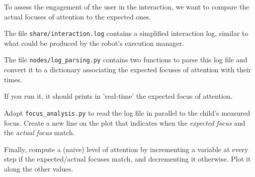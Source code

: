 \documentclass{instructions}
\begin{document}


To assess the engagement of the user in the interaction, we want to compare the
actual focuses of attention to the expected ones.

The file {\tt share/interaction.log} contains a simplified interaction log,
similar to what could be produced by the robot's execution manager.

The file {\tt nodes/log\_parsing.py} contains two functions to parse this log
file and convert it to a dictionary associating the expected focuses of
attention with their times.

If you run it, it should prints in 'real-time' the expected focus of attention.


Adapt {\tt focus\_analysis.py} to read the log file in parallel to the child's measured
focus. Create a new line on the plot that indicates when the \emph{expected
focus} and the \emph{actual focus} match.
%
%

Finally, compute a (naive) level of attention by incrementing a variable at
every step if the expected/actual focuses match, and decrementing it otherwise.
Plot it along the other values.




\end{document}
